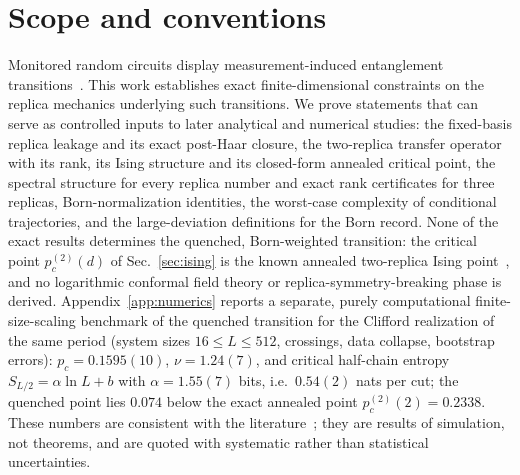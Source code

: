 \documentclass[aps,prx,reprint,superscriptaddress,nobibnotes,longbibliography]{revtex4-2}
\theoremstyle{remark}
\begin{document}

\maketitle

\section{Scope and conventions}

Monitored random circuits display measurement-induced entanglement transitions~\cite{Li2018,Skinner2019,Chan2019,Gullans2020,Choi2020,Vasseur2019,Jian2020,Bao2020}.  This work establishes exact finite-dimensional constraints on the replica mechanics underlying such transitions.  We prove statements that can serve as controlled inputs to later analytical and numerical studies: the fixed-basis replica leakage and its exact post-Haar closure, the two-replica transfer operator with its rank, its Ising structure and its closed-form annealed critical point, the spectral structure for every replica number and exact rank certificates for three replicas, Born-normalization identities, the worst-case complexity of conditional trajectories, and the large-deviation definitions for the Born record.  None of the exact results determines the quenched, Born-weighted transition: the critical point $p_c^{(2)}(d)$ of Sec.~\ref{sec:ising} is the known annealed two-replica Ising point~\cite{Bao2020,Houtappel1950}, and no logarithmic conformal field theory or replica-symmetry-breaking phase is derived.  Appendix~\ref{app:numerics} reports a separate, purely computational finite-size-scaling benchmark of the quenched transition for the Clifford realization of the same period (system sizes $16\le L\le512$, crossings, data collapse, bootstrap errors): $p_c=0.1595(10)$, $\nu=1.24(7)$, and critical half-chain entropy $S_{L/2}=\alpha\ln L+b$ with $\alpha=1.55(7)$ bits, i.e.\ $0.54(2)$ nats per cut; the quenched point lies $0.074$ below the exact annealed point $p_c^{(2)}(2)=0.2338$.  These numbers are consistent with the literature~\cite{Li2019,Zabalo2020,Sierant2022}; they are results of simulation, not theorems, and are quoted with systematic rather than statistical uncertainties.
\end{document}
